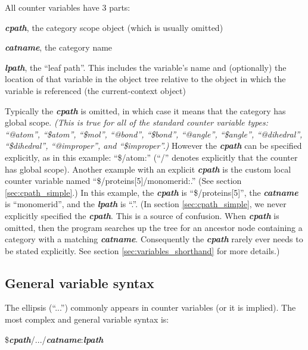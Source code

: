 \documentclass[11pt]{article}
\begin{document}
All counter variables have 3 parts: 

\begin{list}{}
\item
\textit{\textbf{cpath}}, the category scope object (which is usually omitted)
\item
\textit{\textbf{catname}}, the category name
\item
\textit{\textbf{lpath}}, the ``leaf path''. 
               This includes the variable's name and (optionally) 
               the location of that variable in the object tree relative 
               to the object in which the variable is referenced
               (the current-context object)
\item
\end{list}

Typically the \textit{\textbf{cpath}} is omitted, 
in which case it means that the category has global scope. 
\textit{(This is true for all of the standard counter variable types:
``@atom'', ``\$atom'', ``\$mol'',
``@bond'', ``\$bond'',
``@angle'', ``\$angle'',
``@dihedral'', ``\$dihedral'',
``@improper'', and ``\$improper''.)}
However the \textit{\textbf{cpath}} can be specified 
explicitly, as in this example: ``\$/atom:''
(``/'' denotes explicitly that the counter has global scope).
Another example with an explicit \textit{\textbf{cpath}} is
the custom local counter variable named ``\$/proteins[5]/monomerid:.'' 
(See section \ref{sec:cpath_simple}.)
In this example, the \textit{\textbf{cpath}} is ``\$/proteins[5]'', the 
\textit{\textbf{catname}} is ``monomerid'', 
and the \textit{\textbf{lpath}} is ``.''.
(In section 
\ref{sec:cpath_simple}, 
we never explicitly specified the \textit{\textbf{cpath}}. 
This is a source of confusion.
When \textit{\textbf{cpath}} is omitted,
then the program searches up the tree for an ancestor node
containing a category with a matching \textit{\textbf{catname}}.  Consequently
the \textit{\textbf{cpath}} rarely ever needs to be stated explicitly.
See section \ref{sec:variables_shorthand} for more details.)


\subsection{General variable syntax}
The ellipsis (``...'') commonly appears in counter variables 
(or it is implied).  The most complex and general variable syntax is:

\$\textit{\textbf{cpath}}/.../\textit{\textbf{catname}}:\textit{\textbf{lpath}}
\end{document}
